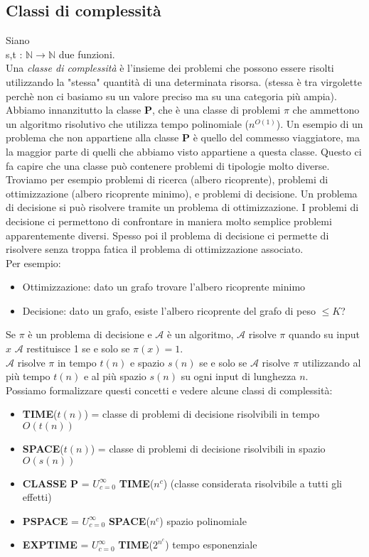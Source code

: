 \subsection{Classi di complessità}
Siano\\
s,t : $\mathbb{N} \rightarrow \mathbb{N}$ due funzioni.\\
Una \emph{classe di complessità} è l'insieme dei problemi che possono essere risolti utilizzando la
"stessa" quantità di una determinata risorsa. (stessa è tra virgolette perchè non
ci basiamo su un valore preciso ma su una categoria più ampia).
Abbiamo innanzitutto la classe \textbf{P}, che è una classe di problemi 
$\pi$ che ammettono un algoritmo risolutivo che utilizza tempo polinomiale ($n^{O(1)}$).
Un esempio di un problema che non appartiene alla classe \textbf{P} è quello del commesso viaggiatore, ma
la maggior parte di quelli che abbiamo visto appartiene a questa classe.
Questo ci fa capire che una classe può contenere problemi di tipologie molto diverse.
Troviamo per esempio problemi di ricerca (albero ricoprente), problemi di ottimizzazione (albero ricoprente minimo),
e problemi di decisione. Un problema di decisione si può risolvere tramite un problema di ottimizzazione.
I problemi di decisione ci permettono di confrontare in maniera molto semplice problemi apparentemente diversi.
Spesso poi il problema di decisione ci permette di risolvere senza troppa fatica 
il problema di ottimizzazione associato.\\
Per esempio:
\begin{itemize}
    \item Ottimizzazione: dato un grafo trovare l'albero ricoprente minimo
    \item Decisione: dato un grafo, esiste l'albero ricoprente del grafo di peso $\le K$? 
\end{itemize}

\noindent Se $\pi$ è un problema di decisione e $\mathcal{A}$ è un algoritmo, $\mathcal{A}$ risolve $\pi$ quando
su input $x$ $\mathcal{A}$ restituisce 1 se e solo se $\pi(x) = 1$.\\
$\mathcal{A}$ risolve $\pi$ in tempo $t(n)$ e spazio $s(n)$ se e solo se 
$\mathcal{A}$ risolve $\pi$ utilizzando al più tempo $t(n)$ e al più spazio $s(n)$ su 
ogni input di lunghezza $n$.\\
Possiamo formalizzare questi concetti e vedere alcune classi di complessità:
\begin{itemize}
    \item \textbf{TIME}($t(n)$) = classe di problemi di decisione risolvibili in tempo $O(t(n))$
    \item \textbf{SPACE}($t(n)$) = classe di problemi di decisione risolvibili in spazio $O(s(n))$
    \item \textbf{CLASSE P} = $U_{c = 0}^{\infty}$ \textbf{TIME}($n^c$) (classe considerata risolvibile a tutti gli effetti)
    \item \textbf{PSPACE} = $U_{c = 0}^{\infty}$ \textbf{SPACE}($n^c$) spazio polinomiale
    \item \textbf{EXPTIME} = $U_{c = 0}^{\infty}$ \textbf{TIME}($2^{n^c}$) tempo esponenziale
\end{itemize}

